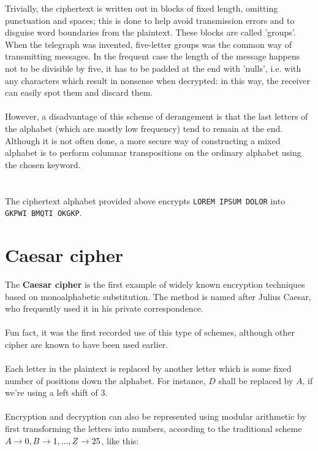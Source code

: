 \documentclass[Lau,binding=0.6cm,oneside]{sapthesis}
\begin{document}
Trivially, the ciphertext is written out in blocks of fixed length, omitting punctuation and spaces; this is done to help avoid transmission errors and to disguise word boundaries from the plaintext. These blocks are called 'groups'. When the telegraph was invented, five-letter groups was the common way of transmitting messages. In the frequent case the length of the message happens not to be divisible by five, it has to be padded at the end with 'nulls', i.e. with any characters which result in nonsense when decrypted: in this way, the receiver can easily spot them and discard them. \\\\
However, a disadvantage of this scheme of derangement is that the last letters of the alphabet (which are mostly low frequency) tend to remain at the end. Although it is not often done, a more secure way of constructing a mixed alphabet is to perform columnar transpositions on the ordinary alphabet using the chosen keyword.\\\\
\ \\
The ciphertext alphabet provided above encrypts \colorbox{gray!12}{\small{\texttt{LOREM IPSUM DOLOR}}}
into\\ \colorbox{gray!12}{\small{\texttt{GKPWI BMQTI OKGKP}}}.

\section{Caesar cipher}
The \textbf{Caesar cipher} is the first example of widely known encryption techniques based on monoalphabetic substitution. The method is named after Julius Caesar, who frequently used it in his private correspondence. \\\\
Fun fact, it was the first recorded use of this type of schemes, although other cipher are known to have been used earlier.\\\\
Each letter in the plaintext is replaced by another letter which is some fixed number of positions down the alphabet. For instance, $D$ shall be replaced by $A$, if we're using a left shift of 3.\\\\
Encryption and decryption can also be represented using modular arithmetic by first transforming the letters into numbers, according to the traditional scheme $A \rightarrow 0,\\ B \rightarrow 1, ... , Z \rightarrow 25$, like this:\\
\end{document}
